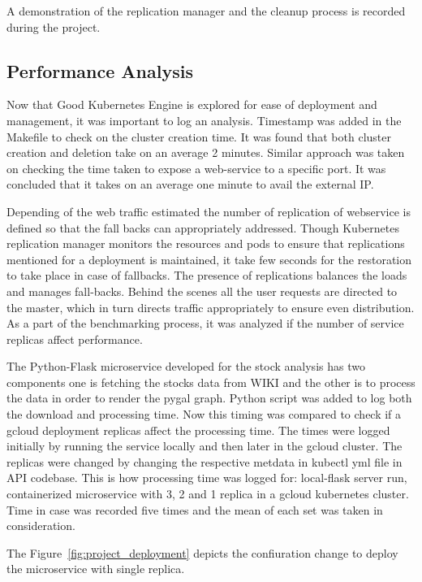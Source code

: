 A demonstration of the replication manager and the cleanup process is
  recorded~\cite{hid-sp18-417-google_cleanup} during the project.

\subsection{Performance Analysis}

Now that Good Kubernetes Engine is explored for ease of deployment and
management, it was important to log an analysis. Timestamp was added in the
Makefile to check on the cluster creation time. It was found that both cluster
creation and deletion take on an average 2 minutes. Similar approach was taken
on checking the time taken to expose a web-service to a specific port. It was
concluded that it takes on an average one minute to avail the external IP. 

Depending of the web traffic estimated the number of replication of webservice
is defined so that the fall backs can appropriately addressed. Though
Kubernetes replication manager monitors the resources and pods to ensure that
replications mentioned for a deployment is maintained, it take few seconds for
the restoration to take place in case of fallbacks. The presence of
replications balances the loads and manages fall-backs. Behind the scenes all
the user requests are directed to the master, which in turn directs traffic
appropriately to ensure even distribution. As a part of the benchmarking
process, it was analyzed if the number of service replicas affect performance.


The Python-Flask microservice developed for the stock analysis has two
components one is fetching the stocks data from WIKI and the other is to
process the data in order to render the pygal graph. Python script was added
to log both the download and processing time. Now this timing was compared to
check if a gcloud deployment replicas affect the processing time. The times
were logged initially by running the service locally and then later in the
gcloud cluster. The replicas were changed by changing the respective metdata
in kubectl yml file in API codebase. This is how processing time was logged
for: local-flask server run, containerized microservice with 3, 2 and 1
replica in a gcloud kubernetes cluster. Time in case was recorded five times
and the mean of each set was taken in consideration.


The Figure~\ref{fig:project_deployment} depicts the confiuration change to
deploy the microservice with single replica.

